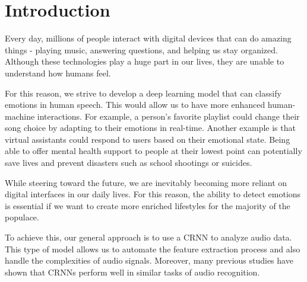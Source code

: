 \documentclass[../main.tex]{subfiles}
\begin{document}
\section{Introduction}
Every day, millions of people interact with digital devices that can do amazing 
things - playing music, answering questions, and helping us stay organized. 
Although these technologies play a huge part in our lives, they are unable to 
understand how humans feel. 

For this reason, we strive to develop a deep learning model that can classify 
emotions in human speech. This would allow us to have more enhanced 
human-machine interactions. For example, a person's favorite playlist could 
change their song choice by adapting to their emotions in real-time. Another 
example is that virtual assistants could respond to users based on their 
emotional state. Being able to offer mental health support to people at their 
lowest point can potentially save lives and prevent disasters such as school 
shootings or suicides.

While steering toward the future, we are inevitably becoming more reliant on 
digital interfaces in our daily lives. For this reason, the ability to detect 
emotions is essential if we want to create more enriched lifestyles for the 
majority of the populace.

To achieve this, our general approach is to use a CRNN to analyze audio data. 
This type of model allows us to automate the feature extraction process and 
also handle the complexities of audio signals. Moreover, many previous studies 
have shown that CRNNs perform well in similar tasks of audio recognition.
\end{document}
